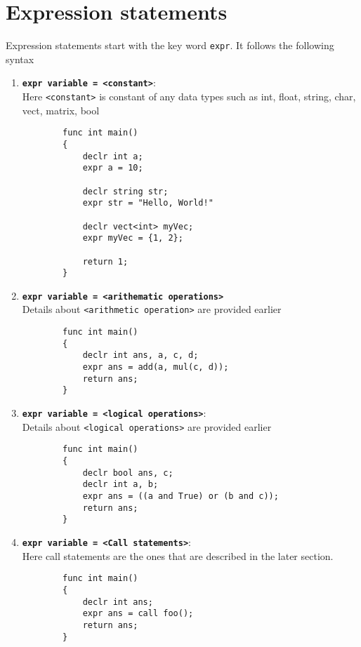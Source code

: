 \documentclass[journal, 18pt]{report}
\begin{document}
\section{Expression statements}
Expression statements start with the key word \texttt{expr}. It follows the following syntax\\
\begin{enumerate}
    \item \textbf{\texttt{expr variable = <constant>}}:\\
    Here \texttt{<constant>} is constant of any data types such as int, float,
    string, char, vect, matrix, bool
    \begin{lstlisting}
        func int main()
        {
            declr int a;
            expr a = 10;

            declr string str;
            expr str = "Hello, World!"

            declr vect<int> myVec;
            expr myVec = {1, 2};

            return 1;
        }
    \end{lstlisting}
    \item \textbf{\texttt{expr variable = <arithematic operations>}} \\
    Details about \texttt{<arithmetic operation>} are provided earlier
    \begin{lstlisting}
        func int main()
        {
            declr int ans, a, c, d;
            expr ans = add(a, mul(c, d));
            return ans;
        }
    \end{lstlisting}
    \item \textbf{\texttt{expr variable = <logical operations>}}:\\
    Details about \texttt{<logical operations>} are provided earlier
    \begin{lstlisting}
        func int main()
        {
            declr bool ans, c;
            declr int a, b;
            expr ans = ((a and True) or (b and c));
            return ans;
        }
    \end{lstlisting}
    \item \textbf{\texttt{expr variable = <Call statements>}}:\\
    Here call statements are the ones that are described in the later section.
    \begin{lstlisting}
        func int main()
        {
            declr int ans;
            expr ans = call foo();
            return ans;
        }
    \end{lstlisting}


\end{enumerate}
\end{document}
